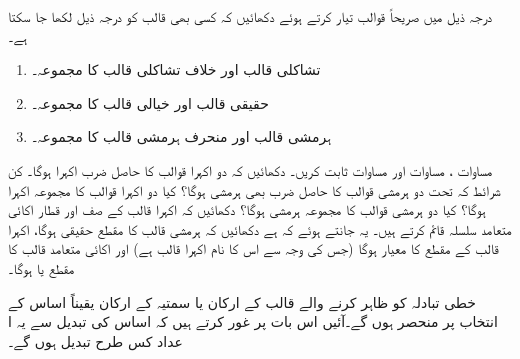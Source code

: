 درجہ ذیل میں صریحاً قوالب تیار کرتے ہوئے دکھائیں کہ کسی بھی قالب  کو درجہ ذیل لکھا جا سکتا ہے۔
\begin{enumerate}
\item
 تشاکلی قالب  اور خلاف تشاکلی قالب  کا مجموعہ۔
\item
 حقیقی قالب  اور خیالی قالب  کا مجموعہ۔
\item
ہرمشی قالب  اور منحرف ہرمشی قالب  کا مجموعہ۔
\end{enumerate}
مساوات ، مساوات   اور مساوات    ثابت کریں۔ دکھائیں کہ دو اکہرا قوالب کا حاصل ضرب اکہرا ہوگا۔ کن شرائط کہ تحت دو ہرمشی قوالب کا حاصل ضرب بھی  ہرمشی ہوگا؟ کیا دو اکہرا قوالب کا مجموعہ اکہرا ہوگا؟ کیا دو ہرمشی قوالب کا مجموعہ ہرمشی ہوگا؟
دکھائیں کہ اکہرا قالب کے صف اور قطار  اکائی متعامد سلسلہ قائم کرتے ہیں۔
یہ  جانتے  ہوئے کہ ہے  دکھائیں کہ ہرمشی قالب کا مقطع حقیقی ہوگا،  اکہرا قالب کے مقطع کا معیار  ہوگا  (جس کی وجہ سے  اس کا نام اکہرا قالب ہے)  اور اکائی متعامد قالب کا مقطع   یا  ہوگا۔

 خطی تبادلہ کو ظاہر کرنے والے قالب کے ارکان یا  سمتیہ کے ارکان  یقیناً  اساس کے  انتخاب پر منحصر ہوں گے۔آئیں اس بات پر غور کرتے ہیں کہ    اساس کی  تبدیل  سے یہ   ا عداد کس طرح   تبدیل  ہوں گے۔
 
